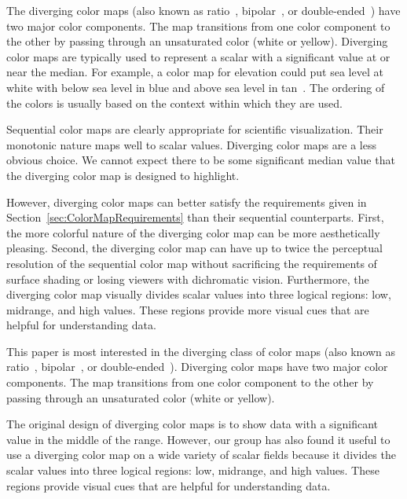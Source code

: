 \documentclass{llncs}
\newcommand{\lcite}[1]{~\cite{#1}}
\begin{document}
{  The diverging color maps (also known as ratio\lcite{Ware04},
  bipolar\lcite{Spence01}, or double-ended\lcite{Rheingans99}) have two major
  color components.  The map transitions from one color component to the
  other by passing through an unsaturated color (white or yellow).  Diverging
  color maps are typically used to represent a scalar with a significant
  value at or near the median.  For example, a color map for elevation could
  put sea level at white with below sea level in blue and above sea level in
  tan\lcite{Tufte97}.  The ordering of the colors is usually based on the
  context within which they are used.

  Sequential color maps are clearly appropriate for scientific visualization.
  Their monotonic nature maps well to scalar values.  Diverging color maps
  are a less obvious choice.  We cannot expect there to be some significant
  median value that the diverging color map is designed to highlight.

  However, diverging color maps can better satisfy the requirements given in
  Section~\ref{sec:ColorMapRequirements} than their sequential counterparts.
  First, the more colorful nature of the diverging color map can be more
  aesthetically pleasing.  Second, the diverging color map can have up to
  twice the perceptual resolution of the sequential color map without
  sacrificing the requirements of surface shading or losing viewers
  with dichromatic vision.  Furthermore, the diverging color map visually
  divides scalar values into three logical regions: low, midrange, and high
  values.  These regions provide more visual cues that are helpful for
  understanding data.

}{ %

  This paper is most interested in the diverging class of color maps (also
  known as ratio\lcite{Ware04}, bipolar\lcite{Spence01}, or
  double-ended\lcite{Rheingans99}).  Diverging color maps have two major
  color components.  The map transitions from one color component to the
  other by passing through an unsaturated color (white or yellow).

  The original design of diverging color maps is to show data with a
  significant value in the middle of the range.  However, our group has also
  found it useful to use a diverging color map on a wide variety of scalar
  fields because it divides the scalar values into three logical regions:
  low, midrange, and high values.  These regions provide visual cues that
  are helpful for understanding data.

}
\end{document}
